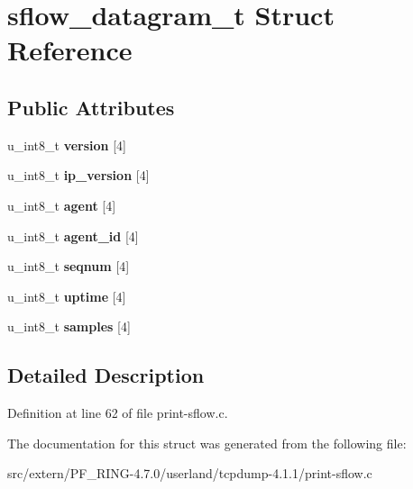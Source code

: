 \hypertarget{structsflow__datagram__t}{
\section{sflow\_\-datagram\_\-t Struct Reference}
\label{structsflow__datagram__t}
}
\subsection*{Public Attributes}
\begin{DoxyCompactItemize}
\item 
\hypertarget{structsflow__datagram__t_a12d4ff0feb18ef485777c37a4c64402f}{
u\_\-int8\_\-t {\bfseries version} \mbox{[}4\mbox{]}}
\label{structsflow__datagram__t_a12d4ff0feb18ef485777c37a4c64402f}

\item 
\hypertarget{structsflow__datagram__t_a8800f4c50feb15c05fdfc8dadf5df6cf}{
u\_\-int8\_\-t {\bfseries ip\_\-version} \mbox{[}4\mbox{]}}
\label{structsflow__datagram__t_a8800f4c50feb15c05fdfc8dadf5df6cf}

\item 
\hypertarget{structsflow__datagram__t_a6284510dc658b42299a5d5993cdddec0}{
u\_\-int8\_\-t {\bfseries agent} \mbox{[}4\mbox{]}}
\label{structsflow__datagram__t_a6284510dc658b42299a5d5993cdddec0}

\item 
\hypertarget{structsflow__datagram__t_ace0aa28592a9c6bd06edf84c18007ee6}{
u\_\-int8\_\-t {\bfseries agent\_\-id} \mbox{[}4\mbox{]}}
\label{structsflow__datagram__t_ace0aa28592a9c6bd06edf84c18007ee6}

\item 
\hypertarget{structsflow__datagram__t_ada5cf15425bae8aafa6a605910095461}{
u\_\-int8\_\-t {\bfseries seqnum} \mbox{[}4\mbox{]}}
\label{structsflow__datagram__t_ada5cf15425bae8aafa6a605910095461}

\item 
\hypertarget{structsflow__datagram__t_abafb5787f4bd6cccc7d716807510c090}{
u\_\-int8\_\-t {\bfseries uptime} \mbox{[}4\mbox{]}}
\label{structsflow__datagram__t_abafb5787f4bd6cccc7d716807510c090}

\item 
\hypertarget{structsflow__datagram__t_ac0c6ddf896e0bbfe8134c65a67d87b45}{
u\_\-int8\_\-t {\bfseries samples} \mbox{[}4\mbox{]}}
\label{structsflow__datagram__t_ac0c6ddf896e0bbfe8134c65a67d87b45}

\end{DoxyCompactItemize}


\subsection{Detailed Description}


Definition at line 62 of file print-\/sflow.c.



The documentation for this struct was generated from the following file:\begin{DoxyCompactItemize}
\item 
src/extern/PF\_\-RING-\/4.7.0/userland/tcpdump-\/4.1.1/print-\/sflow.c\end{DoxyCompactItemize}

